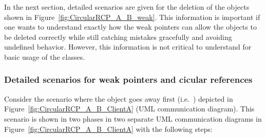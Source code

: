 \documentclass[pdf,ps2pdf,11pt]{SANDreport}
\begin{document}
In the next section, detailed scenarios are given for the deletion of
the objects shown in Figure~\ref{fig:CircularRCP_A_B_weak}.  This
information is important if one wants to understand exactly how the
weak pointers can allow the objects to be deleted correctly while
still catching mistakes gracefully and avoiding undefined behavior.
However, this information is not critical to understand for basic
usage of the classes.


%
{}\subsubsection*{Detailed scenarios for weak pointers and cicular
references}
%

Consider the scenario where the {} object goes away first
(i.e.\ {}) depicted in
Figure~\ref{fig:CircularRCP_A_B_ClientA} (UML communication diagram).
This scenario is shown in two phases in two separate UML communication
diagrams in Figure~\ref{fig:CircularRCP_A_B_ClientA} with the
following steps:
\end{document}
